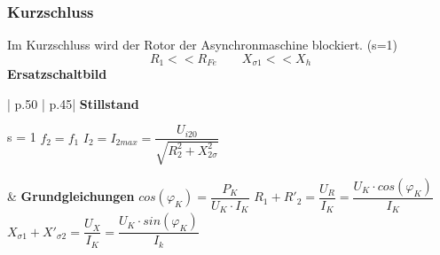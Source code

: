       \subsubsection{Kurzschluss}
          \begin{multicols}{2}
              \begin{minipage}{\linewidth}
                  Im Kurzschluss wird der Rotor der \newline Asynchronmaschine blockiert. (s=1)
                  \[ R_1 << R_{Fe} \qquad X_{\sigma 1} << X_h\]
                  \textbf{Ersatzschaltbild}\newline
              \end{minipage}
              
              \begin{minipage}{\linewidth}
              \end{minipage}
          \end{multicols}   
          
     \begin{longtable}{| p{.50\textwidth} | p{.45\textwidth}|}  
         \hline
         \textbf{Stillstand}\newline 
         \begin{minipage}{0.5\linewidth} 
             s = 1 \newline  
             $ f_2 = f_1 $  \newline 
             $I_2 = I_{2max} = \dfrac{U_{i20}}{\sqrt{R_2^2+X_{2\sigma}^2}}$\newline\newline
            \end{minipage}
        &
        \textbf{Grundgleichungen}\newline
         $ cos(\varphi_K)= \dfrac{P_K}{U_K \cdot I_K} $\newline
        $ R_1 + R'_2 = \dfrac{U_R}{I_K} = \dfrac{U_K \cdot cos(\varphi_K)}{I_K} $\newline
        $ X_{\sigma 1}+ X'_{\sigma 2}= \dfrac{U_X}{I_K}=\dfrac{U_K \cdot sin(\varphi_K)}{I_k} $
        \\ \hline
    \end{longtable}
    \clearpage
